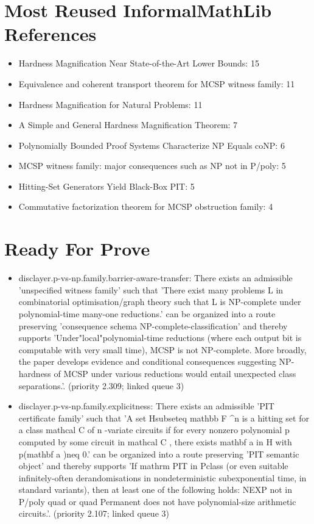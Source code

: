 \documentclass[11pt]{article}
\begin{document}
\section*{Most Reused InformalMathLib References}
\begin{itemize}
\item Hardness Magnification Near State-of-the-Art Lower Bounds: 15
\item Equivalence and coherent transport theorem for MCSP witness family: 11
\item Hardness Magnification for Natural Problems: 11
\item A Simple and General Hardness Magnification Theorem: 7
\item Polynomially Bounded Proof Systems Characterize NP Equals coNP: 6
\item MCSP witness family: major consequences such as NP not in P/poly: 5
\item Hitting-Set Generators Yield Black-Box PIT: 5
\item Commutative factorization theorem for MCSP obstruction family: 4
\end{itemize}

\section*{Ready For Prove}
\begin{itemize}
\item disclayer.p-vs-np.family.barrier-aware-transfer: There exists an admissible 'unspecified witness family' such that 'There exist many problems L in combinatorial optimisation/graph theory such that L is NP-complete under polynomial-time many-one reductions.' can be organized into a route preserving 'consequence schema NP-complete-classification' and thereby supports 'Under"local"polynomial-time reductions (where each output bit is computable with very small time), MCSP is not NP-complete. More broadly, the paper develops evidence and conditional consequences suggesting NP-hardness of MCSP under various reductions would entail unexpected class separations.'. (priority 2.309; linked queue 3)
\item disclayer.p-vs-np.family.explicitness: There exists an admissible 'PIT certificate family' such that 'A set Hsubseteq mathbb F \textasciicircum{}n is a hitting set for a class mathcal C of n -variate circuits if for every nonzero polynomial p computed by some circuit in mathcal C , there exists mathbf a in H with p(mathbf a )neq 0.' can be organized into a route preserving 'PIT semantic object' and thereby supports 'If mathrm PIT in Pclass (or even suitable infinitely-often derandomisations in nondeterministic subexponential time, in standard variants), then at least one of the following holds: NEXP not in P/poly quad or quad Permanent does not have polynomial-size arithmetic circuits.'. (priority 2.107; linked queue 3)
\end{itemize}
\end{document}
